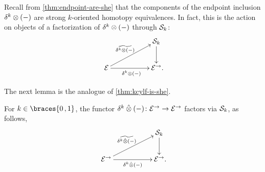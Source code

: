 \documentclass[reqno,10pt,a4paper,oneside,draft]{amsart}
\begin{document}
{{\begin{remark} \label{thm:endpoint-are-she-functorially}
Recall from \cref{thm:endpoint-are-she} that the components of the endpoint inclusion $\kcyl \otimes (-)$ are strong $k$-oriented homotopy equivalences.
In fact, this is the action on objects of a factorization of $\kcyl \otimes (-)$ through $\cal{S}_k$:
\[
\xymatrix@C+3em{
&
  \cal{S}_k
  \ar[d]
\\
  \cal{E}
  \ar[r]_{\kcyl \otimes (-)}
  \ar[ur]^{\widetilde{\kcyl \otimes (-)}}
&
  \cal{E}^\to
\rlap{.}}
\]
\end{remark}

The next lemma is the analogue of \cref{thm:kcylf-is-she}.

\begin{lemma} \label{thm:kcylf-is-she-alg}
For $k \in \braces{0\,, 1}$, the functor $\kcyl \hatotimes (-) \co \cal{E}^\to \to \cal{E}^\to$ factors via $\cal{S}_k$, as follows,
\[
\xymatrix@C+3em{
&
  \cal{S}_k
  \ar[d]
\\
  \cal{E}^\to
  \ar[r]_-{\kcyl \hatotimes (-)}
  \ar[ur]^-{\widetilde{\kcyl \hatotimes (-)}\,}
&
  \cal{E}^\to
\rlap{.}}
\]
\end{lemma}

}}
\end{document}
